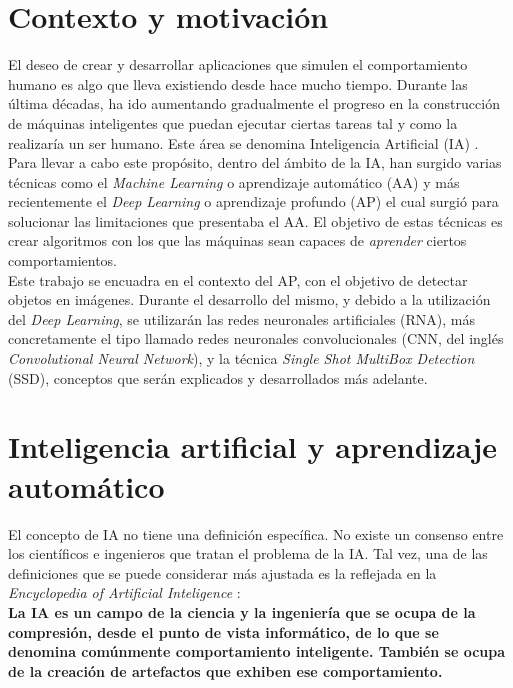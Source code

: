 \documentclass[a4paper, 12pt, spanish, chapterprefix, numbers=noenddot]{book}
\begin{document}
\section{Contexto y motivación}

El deseo de crear y desarrollar aplicaciones que simulen el comportamiento humano es algo que lleva existiendo desde hace mucho tiempo. Durante las última décadas, ha ido aumentando gradualmente el progreso en la construcción de máquinas inteligentes que puedan ejecutar ciertas tareas tal y como la realizaría un ser humano. Este área se denomina Inteligencia Artificial (IA) \cite{IA_Introduccion}.\\

Para llevar a cabo este propósito, dentro del ámbito de la IA, han surgido varias técnicas como el \textit{Machine Learning} o aprendizaje automático (AA) y más recientemente el \textit{Deep Learning} o aprendizaje profundo (AP) el cual surgió para solucionar las limitaciones que presentaba el AA. El objetivo de estas técnicas es crear algoritmos con los que las máquinas sean capaces de \textit{aprender} ciertos comportamientos.\\

Este trabajo se encuadra en el contexto del AP, con el objetivo de detectar objetos en imágenes. Durante el desarrollo del mismo, y debido a la utilización del \textit{Deep Learning}, se utilizarán las redes neuronales artificiales (RNA), más concretamente el tipo llamado redes neuronales convolucionales (CNN, del inglés \textit{Convolutional Neural Network}), y la técnica \textit{Single Shot MultiBox Detection} (SSD), conceptos que serán explicados y desarrollados más adelante.

\section{Inteligencia artificial y aprendizaje automático}

El concepto de IA no tiene una definición específica. No existe un consenso entre los científicos e ingenieros que tratan el problema de la IA. Tal vez, una de las definiciones que se puede considerar más ajustada es la reflejada en la \textit{Encyclopedia of Artificial Inteligence} \cite{IA_Encyclopedia}:\\

\textbf{La IA es un campo de la ciencia y la ingeniería que se ocupa de la compresión, desde el punto de vista informático, de lo que se denomina comúnmente comportamiento inteligente. También se ocupa de la creación de artefactos que exhiben ese comportamiento.}\\
\end{document}
